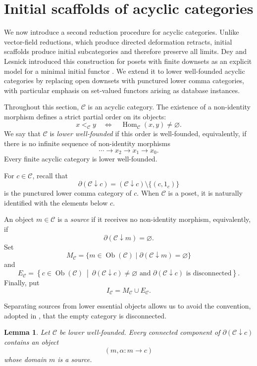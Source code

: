 \documentclass[12pt]{amsart}
\newtheorem{lemma}[teo]{Lemma}
\theoremstyle{definition}
\theoremstyle{remark}
\numberwithin{figure}{section}%
\newcommand{\CC}{\mathcal{C}}
\DeclareMathOperator{\Hom}{Hom}
\begin{document}
\section{Initial scaffolds of acyclic categories}
\label{sec:initial-scaffolds}

We now introduce a second reduction procedure for acyclic categories.
Unlike vector-field reductions, which produce directed deformation
retracts, initial scaffolds produce initial subcategories and therefore
preserve all limits. Dey and Lesnick introduced this construction for
posets with finite downsets as an explicit model for a minimal initial
functor
\cite{dey2026limitcomputationposetsminimal}. We extend it to lower
well-founded acyclic categories by replacing open downsets with punctured
lower comma categories, with particular emphasis on set-valued functors
arising as database instances.

Throughout this section, \(\CC\) is an acyclic category. The existence of
a non-identity morphism defines a strict partial order on its objects:
\[
x<_\CC y
\quad\Longleftrightarrow\quad
\Hom_\CC(x,y)\neq\varnothing.
\]
We say that \(\CC\) is \emph{lower well-founded} if this order is
well-founded, equivalently, if there is no infinite sequence of
non-identity morphisms
\[
\cdots\longrightarrow x_2\longrightarrow x_1\longrightarrow x_0.
\]
Every finite acyclic category is lower well-founded.

For \(c\in\CC\), recall that
\[
\partial(\CC\downarrow c)
=
(\CC\downarrow c)\setminus\{(c,1_c)\}
\]
is the punctured lower comma category of \(c\). When \(\CC\) is a poset,
it is naturally identified with the elements below \(c\).

An object \(m\in\CC\) is a \emph{source} if it receives no non-identity
morphism, equivalently, if
\[
\partial(\CC\downarrow m)=\varnothing.
\]
Set
\[
M_\CC
=
\{m\in\operatorname{Ob}(\CC)
\mid
\partial(\CC\downarrow m)=\varnothing\}
\]
and
\[
E_\CC
=
\left\{
c\in\operatorname{Ob}(\CC)
\ \middle|\
\partial(\CC\downarrow c)\neq\varnothing
\text{ and }
\partial(\CC\downarrow c)\text{ is disconnected}
\right\}.
\]
Finally, put
\[
I_\CC=M_\CC\cup E_\CC.
\]

Separating sources from lower essential objects allows us to avoid the convention, adopted in \cite{dey2026limitcomputationposetsminimal}, that the empty category is disconnected.

\begin{lemma}\label{lem:source-in-each-component}
Let \(\CC\) be lower well-founded. Every connected component of
\(\partial(\CC\downarrow c)\) contains an object
\[
(m,\alpha\colon m\to c)
\]
whose domain \(m\) is a source.
\end{lemma}
\end{document}
